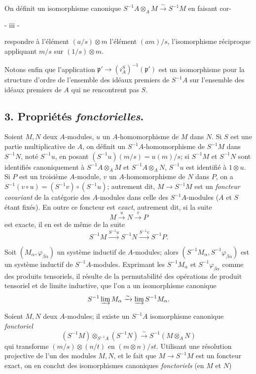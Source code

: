 On définit un isomorphisme canonique $S^{-1}A \otimes_A M \xrightarrow{\sim} S^{-1}M$ en faisant cor-

\newpage


\begin{center}
- iii -
\end{center}

respondre à l'élément $(a/s) \otimes m$ l'élément $(am)/s$, l'isomorphisme réciproque appliquant $m/s$ sur $(1/s) \otimes m$.

Notons enfin que l'application $\mathfrak{p}' \to (i_A^S)^{-1}(\mathfrak{p}')$ est un isomorphisme pour la structure d'ordre de l'ensemble des idéaux premiers de $S^{-1}A$ sur l'ensemble des idéaux premiers de $A$ qui ne rencontrent pas $S$.

\subsection*{3. Propriétés \emph{fonctorielles}.}

Soient $M, N$ deux $A$-modules, $u$ un $A$-homomorphisme de $M$ dans $N$. Si $S$ est une partie multiplicative de $A$, on définit un $S^{-1}A$-homomorphisme de $S^{-1}M$ dans $S^{-1}N$, noté $S^{-1}u$, en posant $(S^{-1}u)(m/s) = u(m)/s$; si $S^{-1}M$ et $S^{-1}N$ sont identifiés canoniquement à $S^{-1}A \otimes_A M$ et $S^{-1}A \otimes_A N$, $S^{-1}u$ est identifié à $1 \otimes u$. Si $P$ est un troisième $A$-module, $v$ un $A$-homomorphisme de $N$ dans $P$, on a $S^{-1}(v \circ u) = (S^{-1}v) \circ (S^{-1}u)$; autrement dit, $M \to S^{-1}M$ est un \emph{foncteur covariant} de la catégorie des $A$-modules dans celle des $S^{-1}A$-modules ($A$ et $S$ étant fixés). En outre ce foncteur est \emph{exact}, autrement dit, si la suite
$$M \xrightarrow{u} N \xrightarrow{v} P$$
est exacte, il en est de même de la suite
$$S^{-1}M \xrightarrow{S^{-1}u} S^{-1}N \xrightarrow{S^{-1}v} S^{-1}P.$$

Soit $(M_\alpha, \varphi_{\beta\alpha})$ un système inductif de $A$-modules; alors $(S^{-1}M_\alpha, S^{-1}\varphi_{\beta\alpha})$ est un système inductif de $S^{-1}A$-modules. Exprimant les $S^{-1}M_\alpha$ et $S^{-1}\varphi_{\beta\alpha}$ comme des produits tensoriels, il résulte de la permutabilité des opérations de produit tensoriel et de limite inductive, que l'on a un isomorphisme canonique
$$S^{-1} \varinjlim M_\alpha \xrightarrow{\sim} \varinjlim S^{-1}M_\alpha.$$

Soient $M, N$ deux $A$-modules; il existe un $S^{-1}A$ isomorphisme canonique \emph{fonctoriel}
$$(S^{-1}M) \otimes_{S^{-1}A} (S^{-1}N) \xrightarrow{\sim} S^{-1}(M \otimes_A N)$$
qui transforme $(m/s) \otimes (n/t)$ en $(m \otimes n)/st$. Utilisant une résolution projective de l'un des modules $M, N$, et le fait que $M \to S^{-1}M$ est un foncteur exact, on en conclut des isomorphismes canoniques \emph{fonctoriels} (en $M$ et $N$)

